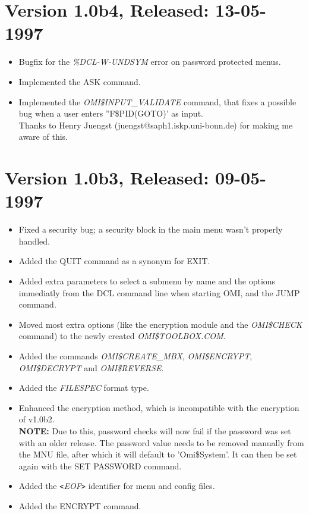\documentclass[a4paper]{book}
\newcommand{\lt}{\texttt{<}}
\newcommand{\gt}{\texttt{>}}
\begin{document}
\section*{Version 1.0b4, Released: 13-05-1997}

\begin{itemize}
\item Bugfix for the \textsl{\%DCL-W-UNDSYM} error on password protected menus.
\item Implemented the \textsf{ASK} command.
\item Implemented the \textsl{OMI{\$}INPUT{\_}VALIDATE} command, that fixes a possible bug when a user enters \textsf{''F{\$}PID(GOTO)'} as input.\\
Thanks to Henry Juengst (juengst@saph1.iskp.uni-bonn.de) for making me aware of this.
\end{itemize}

\section*{Version 1.0b3, Released: 09-05-1997}

\begin{itemize}
\item Fixed a security bug; a security block in the main menu wasn't properly handled.
\item Added the \textsf{QUIT} command as a synonym for \textsf{EXIT}.
\item Added extra parameters to select a submenu by name and the options immediatly from the DCL command line when starting OMI, and the \textsf{JUMP} command.
\item Moved most extra options (like the encryption module and the \textsl{OMI{\$}CHECK} command) to the newly created \textsl{OMI{\$}TOOLBOX.COM}.
\item Added the commands \textsl{OMI{\$}CREATE{\_}MBX}, \textsl{OMI{\$}ENCRYPT}, \textsl{OMI{\$}DECRYPT} and \textsl{OMI{\$}REVERSE}.
\item Added the \textsl{FILESPEC} format type.
\item Enhanced the encryption method, which is incompatible with the encryption of v1.0b2.\\
\textbf{NOTE:} Due to this, password checks will now fail if the password was set with an older release. The password value needs to be removed manually from the MNU file, after which it will default to 'Omi{\$}System'. It can then be set again with the \textsf{SET PASSWORD} command.
\item Added the \textsl{\lt EOF\gt} identifier for menu and config files.
\item Added the \textsf{ENCRYPT} command.
\end{itemize}
\end{document}
